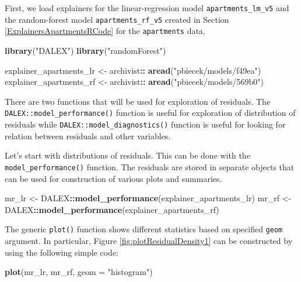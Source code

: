 \documentclass[]{krantz}
\newenvironment{Shaded}{\begin{snugshade}}{\end{snugshade}}
\newcommand{\DataTypeTok}[1]{\textcolor[rgb]{0.13,0.29,0.53}{#1}}
\newcommand{\KeywordTok}[1]{\textcolor[rgb]{0.13,0.29,0.53}{\textbf{#1}}}
\newcommand{\NormalTok}[1]{#1}
\newcommand{\OperatorTok}[1]{\textcolor[rgb]{0.81,0.36,0.00}{\textbf{#1}}}
\newcommand{\StringTok}[1]{\textcolor[rgb]{0.31,0.60,0.02}{#1}}
\begin{document}
First, we load explainers for the linear-regression model \texttt{apartments\_lm\_v5} and the random-forest model \texttt{apartments\_rf\_v5} created in Section \ref{ExplainersApartmentsRCode} for the \texttt{apartments} data.

\begin{Shaded}
\begin{Highlighting}[]
\KeywordTok{library}\NormalTok{(}\StringTok{"DALEX"}\NormalTok{)}
\KeywordTok{library}\NormalTok{(}\StringTok{"randomForest"}\NormalTok{)}

\NormalTok{explainer_apartments_lr <-}\StringTok{ }\NormalTok{archivist}\OperatorTok{::}\StringTok{ }\KeywordTok{aread}\NormalTok{(}\StringTok{"pbiecek/models/f49ea"}\NormalTok{)}
\NormalTok{explainer_apartments_rf <-}\StringTok{ }\NormalTok{archivist}\OperatorTok{::}\StringTok{ }\KeywordTok{aread}\NormalTok{(}\StringTok{"pbiecek/models/569b0"}\NormalTok{)}
\end{Highlighting}
\end{Shaded}

There are two functions that will be used for exploration of residuals.
The \texttt{DALEX::model\_performance()} function is useful for exploration of distribution of residuals while \texttt{DALEX::model\_diagnostics()} function is useful for looking for relation between residuals and other variables.

Let's start with distributions of residuals. This can be done with the \texttt{model\_performance()} function. The residuals are stored in separate objects that can be used for construction of various plots and summaries.

\begin{Shaded}
\begin{Highlighting}[]
\NormalTok{mr_lr <-}\StringTok{ }\NormalTok{DALEX}\OperatorTok{::}\KeywordTok{model_performance}\NormalTok{(explainer_apartments_lr)}
\NormalTok{mr_rf <-}\StringTok{ }\NormalTok{DALEX}\OperatorTok{::}\KeywordTok{model_performance}\NormalTok{(explainer_apartments_rf)}
\end{Highlighting}
\end{Shaded}

The generic \texttt{plot()} function shows different statistics based on specified \texttt{geom} argument. In particular, Figure \ref{fig:plotResidualDensity1} can be constructed by using the following simple code:

\begin{Shaded}
\begin{Highlighting}[]
\KeywordTok{plot}\NormalTok{(mr_lr, mr_rf, }\DataTypeTok{geom =} \StringTok{"histogram"}\NormalTok{) }
\end{Highlighting}
\end{Shaded}
\end{document}
